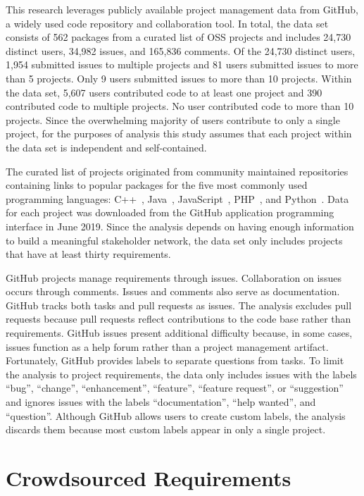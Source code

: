 This research leverages publicly available project management data from GitHub, a widely used code repository and collaboration tool. In total, the data set consists of 562 packages from a curated list of OSS projects and includes 24,730 distinct users, 34,982 issues, and 165,836 comments. Of the 24,730 distinct users, 1,954 submitted issues to multiple projects and 81 users submitted issues to more than 5 projects. Only 9 users submitted issues to more than 10 projects. Within the data set, 5,607 users contributed code to at least one project and 390 contributed code to multiple projects. No user contributed code to more than 10 projects. Since the overwhelming majority of users contribute to only a single project, for the purposes of analysis this study assumes that each project within the data set is independent and self-contained.

The curated list of projects originated from community maintained repositories containing links to popular packages for the five most commonly used programming languages: C++~\cite{cpp}, Java~\cite{java}, JavaScript~\cite{javascript}, PHP~\cite{php}, and Python~\cite{python}. Data for each project was downloaded from the GitHub application programming interface in June 2019. Since the analysis depends on having enough information to build a meaningful stakeholder network, the data set only includes projects that have at least thirty requirements.

GitHub projects manage requirements through issues. Collaboration on issues occurs through comments. Issues and comments also serve as documentation. GitHub tracks both tasks and pull requests as issues. The analysis excludes pull requests because pull requests reflect contributions to the code base rather than requirements. GitHub issues present additional difficulty because, in some cases, issues function as a help forum rather than a project management artifact. Fortunately, GitHub provides labels to separate questions from tasks. To limit the analysis to project requirements, the data only includes issues with the labels “bug”, “change”, “enhancement”, “feature”, “feature request”, or “suggestion” and ignores issues with the labels “documentation”, “help wanted”, and “question”. Although GitHub allows users to create custom labels, the analysis discards them because most custom labels appear in only a single project. 

\section{Crowdsourced Requirements}

